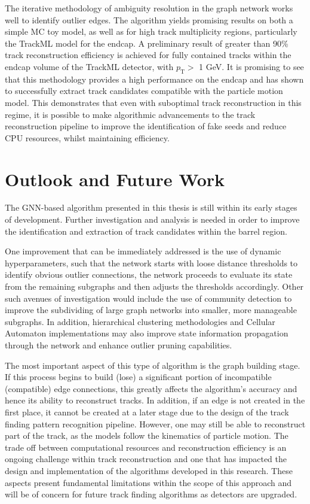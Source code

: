 The iterative methodology of ambiguity resolution in the graph network works well to identify outlier edges. The algorithm yields promising results on both a simple MC toy model, as well as for high track multiplicity regions, particularly the TrackML model for the endcap. A preliminary result of greater than 90\% track reconstruction efficiency is achieved for fully contained tracks within the endcap volume of the TrackML detector, with $p_{\text{T}} >$ 1 GeV. It is promising to see that this methodology provides a high performance on the endcap and has shown to successfully extract track candidates compatible with the particle motion model. This demonstrates that even with suboptimal track reconstruction in this regime, it is possible to make algorithmic advancements to the track reconstruction pipeline to improve the identification of fake seeds and reduce CPU resources, whilst maintaining efficiency. 


\section{Outlook and Future Work}

The GNN-based algorithm presented in this thesis is still within its early stages of development. Further investigation and analysis is needed in order to improve the identification and extraction of track candidates within the barrel region.

One improvement that can be immediately addressed is the use of dynamic hyperparameters, such that the network starts with loose distance thresholds to identify obvious outlier connections, the network proceeds to evaluate its state from the remaining subgraphs and then adjusts the thresholds accordingly. Other such avenues of investigation would include the use of community detection to improve the subdividing of large graph networks into smaller, more manageable subgraphs. In addition, hierarchical clustering methodologies and Cellular Automaton implementations may also improve state information propagation through the network and enhance outlier pruning capabilities.

The most important aspect of this type of algorithm is the graph building stage. If this process begins to build (lose) a significant portion of incompatible (compatible) edge connections, this greatly affects the algorithm’s accuracy and hence its ability to reconstruct tracks. In addition, if an edge is not created in the first place, it cannot be created at a later stage due to the design of the track finding pattern recognition pipeline. However, one may still be able to reconstruct part of the track, as the models follow the kinematics of particle motion. The trade off between computational resources and reconstruction efficiency is an ongoing challenge within track reconstruction and one that has impacted the design and implementation of the algorithms developed in this research. These aspects present fundamental limitations within the scope of this approach and will be of concern for future track finding algorithms as detectors are upgraded.


